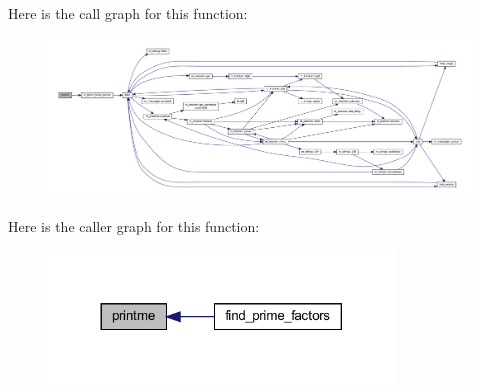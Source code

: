 Here is the call graph for this function\+:
\nopagebreak
\begin{figure}[H]
\begin{center}
\leavevmode
\includegraphics[width=350pt]{factors_8f90_a96d1688b4d46c7b9dfe3e34cf97426a6_cgraph}
\end{center}
\end{figure}
Here is the caller graph for this function\+:
\nopagebreak
\begin{figure}[H]
\begin{center}
\leavevmode
\includegraphics[width=260pt]{factors_8f90_a96d1688b4d46c7b9dfe3e34cf97426a6_icgraph}
\end{center}
\end{figure}

